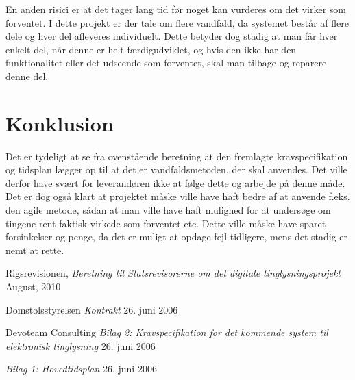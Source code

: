 \documentclass[10pt,a4paper,danish]{article}
\begin{document}
En anden risici er at det tager lang tid før noget kan vurderes om det virker som forventet. I dette projekt er der tale om flere vandfald, da systemet består af flere dele og hver del afleveres individuelt. Dette betyder dog stadig at man får hver enkelt del, når denne er helt færdigudviklet, og hvis den ikke har den funktionalitet eller det udseende som forventet, skal man tilbage og reparere denne del.


\section{Konklusion}
Det er tydeligt at se fra ovenstående beretning at den fremlagte kravspecifikation og tidsplan lægger op til at det er vandfaldsmetoden, der skal anvendes. Det ville derfor have svært for leverandøren ikke at følge dette og arbejde på denne måde. Det er dog også klart at projektet måske ville have haft bedre af at anvende f.eks. den agile metode, sådan at man ville have haft mulighed for at undersøge om tingene rent faktisk virkede som forventet etc. Dette ville måske have sparet forsinkelser og penge, da det er muligt at opdage fejl tidligere, mens det stadig er nemt at rette.


\begin{thebibliography}{9}

  Rigsrevisionen,
  \emph{Beretning til Statsrevisorerne om det digitale
  tinglysningsprojekt}
  August, 2010

Domstolsstyrelsen
  \emph{Kontrakt}
  26. juni 2006

  Devoteam Consulting
  \emph{Bilag 2: Kravspecifikation for det kommende
  system til elektronisk tinglysning}
  26. juni 2006

  \emph{Bilag 1: Hovedtidsplan}
  26. juni 2006

\end{thebibliography}
\end{document}
